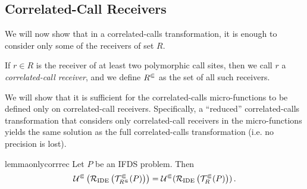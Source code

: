 \subsection{Correlated-Call Receivers}\label{sec:ccreceivers}
We will now show that in a correlated-calls transformation, it is enough to consider only some of the receivers of set $R$.

\begin{definition}
    If $r\in R$ is the receiver of at least two polymorphic
    call sites, then we call $r$ a \textit{correlated-call receiver}, and we define ${R^\Subset}$ as the set of all
  such receivers.
\end{definition}

We will show that it is sufficient for the correlated-calls
micro-functions to be defined only on correlated-call receivers.
Specifically, a ``reduced'' correlated-calls transformation that
considers only correlated-call receivers in the micro-functions
yields the same solution as the full correlated-calls transformation
(i.e. no precision is lost).

\begin{restatable}{lemma}{onlycorrrec}\label{lem:onlycorrrec}
Let $P$ be an IFDS problem. Then  
  \begin{equation}
    \mathcal U^\Subset\left(\mathcal R_{\text{IDE}}\left(\mathcal T^\Subset_{R^\Subset}(P)\right)\right)=\mathcal U^\Subset(\mathcal R_{\text{IDE}}\left(\mathcal T^\Subset_R(P)\right))\,.
  \end{equation}
\end{restatable}


